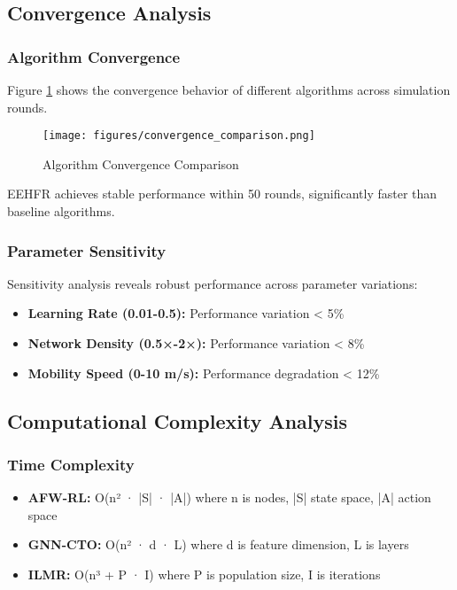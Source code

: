 \documentclass[conference]{IEEEtran}
\begin{document}
\subsection{Convergence Analysis}

\subsubsection{Algorithm Convergence}

Figure \ref{fig:convergence_comparison} shows the convergence behavior of different algorithms across simulation rounds.

\begin{figure}[htbp]
\centering
\texttt{[image: figures/convergence\_comparison.png]}
\caption{Algorithm Convergence Comparison}
\label{fig:convergence_comparison}
\end{figure}

EEHFR achieves stable performance within 50 rounds, significantly faster than baseline algorithms.

\subsubsection{Parameter Sensitivity}

Sensitivity analysis reveals robust performance across parameter variations:

\begin{itemize}
    \item \textbf{Learning Rate (0.01-0.5):} Performance variation < 5\%
    \item \textbf{Network Density (0.5×-2×):} Performance variation < 8\%
    \item \textbf{Mobility Speed (0-10 m/s):} Performance degradation < 12\%
\end{itemize}

\subsection{Computational Complexity Analysis}

\subsubsection{Time Complexity}

\begin{itemize}
    \item \textbf{AFW-RL:} O(n² · |S| · |A|) where n is nodes, |S| state space, |A| action space
    \item \textbf{GNN-CTO:} O(n² · d · L) where d is feature dimension, L is layers
    \item \textbf{ILMR:} O(n³ + P · I) where P is population size, I is iterations
\end{itemize}
\end{document}
